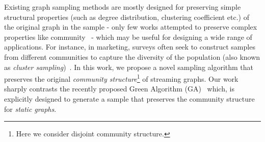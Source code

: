 Existing graph sampling methods are mostly designed for preserving simple structural properties 
(such as degree distribution, clustering coefficient etc.) of the original graph in the sample - only few works attempted
 to
preserve complex properties like community~\cite{tong2016novel,maiya2010sampling} - which may be useful for designing a wide range of applications.
For instance, in marketing, surveys often seek to construct 
samples from different communities to capture  the diversity of the population (also known as \textit{cluster sampling})~\cite{kolascyk2013statistical}. 
In this work, we propose a novel sampling algorithm that preserves the original {\em community structure}\footnote{Here we consider disjoint community structure.} of streaming graphs. Our work sharply contrasts the recently proposed Green Algorithm (GA)~\cite{tong2016novel} which, is explicitly designed to generate a sample that preserves the community structure for {\em static graphs}. 

